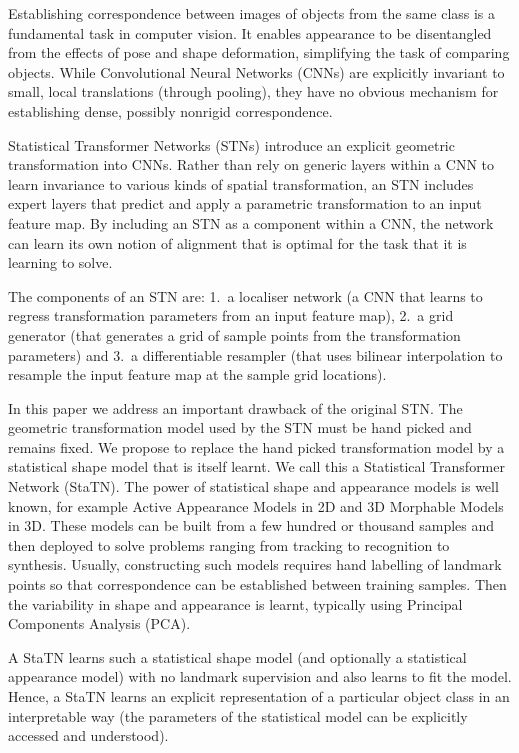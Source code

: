 \documentclass[runningheads]{llncs}
\begin{document}
Establishing correspondence between images of objects from the same class is a fundamental task in computer vision. It enables appearance to be disentangled from the effects of pose and shape deformation, simplifying the task of comparing objects. While Convolutional Neural Networks (CNNs) are explicitly invariant to small, local translations (through pooling), they have no obvious mechanism for establishing dense, possibly nonrigid correspondence. 

Statistical Transformer Networks (STNs) \cite{jaderberg2015spatial} introduce an explicit geometric transformation into CNNs. Rather than rely on generic layers within a CNN to learn invariance to various kinds of spatial transformation, an STN includes expert layers that predict and apply a parametric transformation to an input feature map. By including an STN as a component within a CNN, the network can learn its own notion of alignment that is optimal for the task that it is learning to solve. 

The components of an STN are: 1.~a localiser network (a CNN that learns to regress transformation parameters from an input feature map), 2.~a grid generator (that generates a grid of sample points from the transformation parameters) and 3.~a differentiable resampler (that uses bilinear interpolation to resample the input feature map at the sample grid locations).

In this paper we address an important drawback of the original STN. The geometric transformation model used by the STN must be hand picked and remains fixed. We propose to replace the hand picked transformation model by a statistical shape model that is itself learnt. We call this a Statistical Transformer Network (StaTN). The power of statistical shape and appearance models is well known, for example Active Appearance Models \cite{cootes2001active} in 2D and 3D Morphable Models \cite{blanz1999morphable} in 3D. These models can be built from a few hundred or thousand samples and then deployed to solve problems ranging from tracking to recognition to synthesis. Usually, constructing such models requires hand labelling of landmark points so that correspondence can be established between training samples. Then the variability in shape and appearance is learnt, typically using Principal Components Analysis (PCA). 

A StaTN learns such a statistical shape model (and optionally a statistical appearance model) with no landmark supervision and also learns to fit the model. Hence, a StaTN learns an explicit representation of a particular object class in an interpretable way (the parameters of the statistical model can be explicitly accessed and understood).
\end{document}
